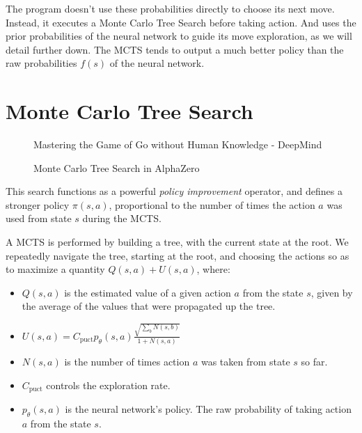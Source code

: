 \documentclass[12pt]{article}
\begin{document}
The program doesn't use these probabilities directly to choose its next move.
Instead, it executes a Monte Carlo Tree Search before taking action. And uses
the prior probabilities of the neural network to guide its move exploration,
as we will detail further down. The MCTS tends to output a much better policy
than the raw probabilities $f(s)$ of the neural network.

\section{Monte Carlo Tree Search}
\begin{figure}[h!]
    \centering
    {\textcopyright Mastering the Game of Go without Human Knowledge - DeepMind}
    \caption{Monte Carlo Tree Search in AlphaZero}
\end{figure}

This search functions as a powerful \textit{policy improvement} operator, and
defines a stronger policy $\pi(s, a)$, proportional to the number of times
the action $a$ was used from state $s$ during the MCTS.

A MCTS is performed by building a tree, with the current state at the root.
We repeatedly navigate the tree, starting at the root, and choosing the actions
so as to maximize a quantity $Q(s,a) + U(s,a)$, where:
\begin{itemize}
    \item $Q(s,a)$ is the estimated value of a given action $a$ from the state
        $s$, given by the average of the values that were propagated up the
        tree.
    \item $U(s,a) = C_{\text{puct}} p_\theta(s,a)\frac{\sqrt{\sum_b
        N(s,b)}}{1+N(s,a)}$
    \item $N(s,a)$ is the number of times action $a$ was taken from state $s$
        so far.
    \item $C_{\text{puct}}$ controls the exploration rate.
    \item $p_\theta(s,a)$ is the neural network's policy. The raw probability
        of taking action $a$ from the state $s$.
\end{itemize}
\end{document}
